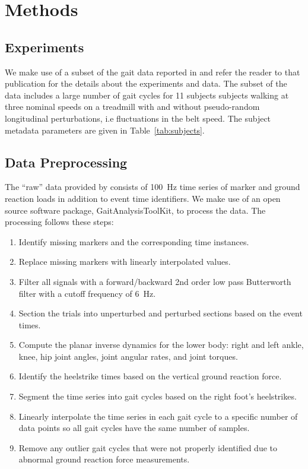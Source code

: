 \documentclass{article}
\begin{document}
\section*{Methods}
%
\subsection*{Experiments}
%
We make use of a subset of the gait data reported in \cite{Moore2015} and refer
the reader to that publication for the details about the experiments and data.
The subset of the data includes a large number of gait cycles for 11 subjects
subjects walking at three nominal speeds on a treadmill with and without
pseudo-random longitudinal perturbations, i.e fluctuations in the belt speed.
The subject metadata parameters are given in Table~\ref{tab:subjects}.
%
\begin{table}
  \cprotect\caption{Information about the 11 study participants. The final
    three columns provide the trial numbers associated with each nominal
    treadmill speed. The measured mass is computed from the mean total vertical
    ground reaction force just after the calibration pose event. Generated by
    \verb|src/subject_table.py|.}
  \centering
  
  \label{tab:subjects}
\end{table}

\subsection*{Data Preprocessing}
%
The ``raw'' data provided by \cite{Moore2015} consists of 100~\si{\hertz} time
series of marker and ground reaction loads in addition to event time
identifiers. We make use of an open source software package,
GaitAnalysisToolKit, to process the data. The processing follows these steps:
%
\begin{enumerate}
  \item Identify missing markers and the corresponding time instances.
  \item Replace missing markers with linearly interpolated values.
  \item Filter all signals with a forward/backward 2nd order low pass
    Butterworth filter with a cutoff frequency of 6~\si{\hertz}.
  \item Section the trials into unperturbed and perturbed sections based on the
    event times.
  \item Compute the planar inverse dynamics for the lower body: right and left
    ankle, knee, hip joint angles, joint angular rates, and joint torques.
  \item Identify the heelstrike times based on the vertical ground reaction
    force.
  \item Segment the time series into gait cycles based on the right foot's
    heelstrikes.
  \item Linearly interpolate the time series in each gait cycle to a specific
    number of data points so all gait cycles have the same number of samples.
  \item Remove any outlier gait cycles that were not properly identified due to
    abnormal ground reaction force measurements.
\end{enumerate}
\end{document}
